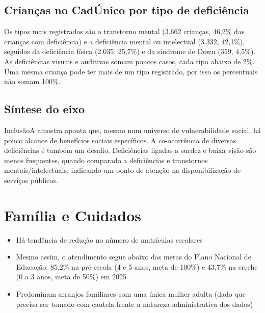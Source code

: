 \section{Crianças no CadÚnico por tipo de deficiência}


Os tipos mais registrados são o transtorno mental (3.662 crianças, 46,2\% das crianças com deficiência) e a deficiência mental ou intelectual (3.332, 42,1\%), seguidos da deficiência física (2.035, 25,7\%) e da síndrome de Down (359, 4,5\%). As deficiências visuais e auditivas somam poucos casos, cada tipo abaixo de 2\%. Uma mesma criança pode ter mais de um tipo registrado, por isso os percentuais não somam 100\%.


\section{Síntese do eixo}

\begin{sintese}{Inclusão}A amostra aponta que, mesmo num universo de vulnerabilidade social, há pouco alcance de benefícios sociais específicos. A co-ocorrência de diversas deficiências é também um desafio. Deficiências ligadas a surdez e baixa visão são menos frequentes, quando comparado a deficiências e transtornos mentais/intelectuais, indicando um ponto de atenção na disponibilização de serviços públicos.\end{sintese}


\chapter{Família e Cuidados}\label{cap:eixo-3}

\begin{achados}\begin{itemize}

\item Há tendência de redução no número de matrículas escolares

\item Mesmo assim, o atendimento segue abaixo das metas do Plano Nacional de Educação: 85,2\% na pré-escola (4 e 5 anos, meta de 100\%) e 43,7\% na creche (0 a 3 anos, meta de 50\%) em 2025

\item Predominam arranjos familiares com uma única mulher adulta (dado que precisa ser tomado com cautela frente a natureza administrativa dos dados)

\end{itemize}\end{achados}

